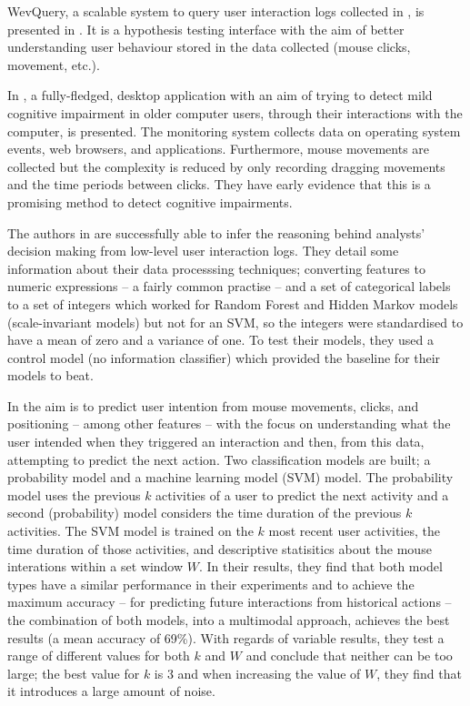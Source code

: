 \documentclass{llncs2e/llncs}
\begin{document}
  WevQuery, a scalable system to query user interaction logs collected in \cite{
  apaolaza2015longitudinal, vigo2013evaluating, vigo2013coping}, is presented in
  \cite{apaolaza2017wevquery}. It is a hypothesis testing interface with the aim
  of better understanding user behaviour stored in the data collected (mouse clicks,
  movement, etc.).

  In \cite{gledson2016combining, bull2016combining}, a fully-fledged, desktop
  application with an aim of trying to detect mild cognitive impairment in older
  computer users, through their interactions with the computer, is presented.
  The monitoring system collects data on operating system events, web browsers,
  and applications. Furthermore, mouse movements are collected but the complexity
  is reduced by only recording dragging movements and the time periods between
  clicks. They have early evidence that this is a promising method to detect
  cognitive impairments.

  The authors in \cite{kodagoda2017using} are successfully able to infer the
  reasoning behind analysts' decision making from low-level user interaction logs.
  They detail some information about their data processsing techniques; converting
  features to numeric expressions -- a fairly common practise -- and a set of
  categorical labels to a set of integers which worked for Random Forest and
  Hidden Markov models (scale-invariant models) but not for an SVM, so the integers
  were standardised to have a mean of zero and a variance of one. To test their
  models, they used a control model (no information classifier) which provided
  the baseline for their models to beat.

  In \cite{fu2017your} the aim is to predict user intention from mouse movements,
  clicks, and positioning -- among other features -- with the focus on understanding
  what the user intended when they triggered an interaction and then, from this
  data, attempting to predict the next action. Two classification models are built;
  a probability model and a machine learning model (SVM) model. The probability model
  uses the previous $k$ activities of a user to predict the next activity and a second
  (probability) model considers the time duration of the previous $k$ activities. The
  SVM model is trained on the $k$ most recent user activities, the time duration of those
  activities, and descriptive statisitics about the mouse interations within a set window
  $W$. In their results, they find that both model types have a similar performance in their
  experiments and to achieve the maximum accuracy -- for predicting future interactions
  from historical actions -- the combination of both models, into a multimodal approach,
  achieves the best results (a mean accuracy of 69\%). With regards of variable results,
  they test a range of different values for both $k$ and $W$ and conclude that neither
  can be too large; the best value for $k$ is 3 and when increasing the value of $W$, they
  find that it introduces a large amount of noise.
\end{document}
